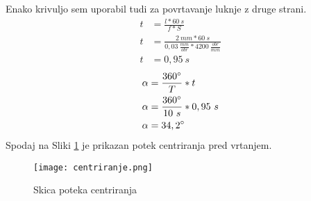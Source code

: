 Enako krivuljo sem uporabil tudi za povrtavanje luknje z druge strani.
\begin{equation}
	\begin{split}
		t &= \frac{l*60\ s}{f*S} \\
		t &= \frac{2\ mm*60\ s}{0,03\ \frac{mm}{obr}*4200\ \frac{obr}{min}} \\
		t &= 0,95\ s
	\end{split}
\end{equation}
\begin{equation}
	\begin{split}
		\alpha &= \frac{360\degree}{T} * t \\
		\alpha &= \frac{360\degree}{10\ s} * 0,95\  s\\
		\alpha &= 34,2\degree
	\end{split}
\end{equation}
Spodaj na Sliki \ref{centriranje} je prikazan potek
centriranja pred vrtanjem.
\begin{figure}[H]
	\begin{center}
		\texttt{[image: centriranje.png]}
		\caption{Skica poteka centriranja
			\cite{lasten}}
		\label{centriranje}
	\end{center}
\end{figure}
